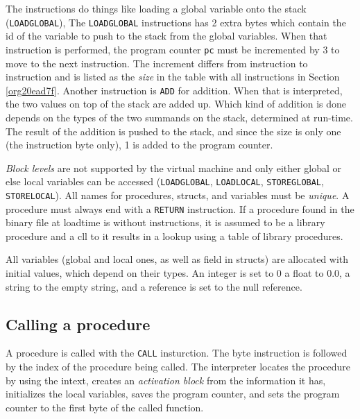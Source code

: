 \documentclass[11pt]{article}
\begin{document}


The instructions do things like loading a global variable onto the stack
(\texttt{LOADGLOBAL}), The \texttt{LOADGLOBAL} instructions has 2 extra bytes which
contain the id of the variable to push to the stack from the global
variables. When that instruction is performed, the program counter \texttt{pc}
must be incremented by 3 to move to the next instruction. The increment
differs from instruction to instruction and is listed as the \emph{size} in the
table with all instructions in Section \ref{org20ead7f}. Another
instruction is \texttt{ADD} for addition. When that is interpreted, the two values
on top of the stack are added up. Which kind of addition is done depends on
the types of the two summands on the stack, determined at run-time. The
result of the addition is pushed to the stack, and since the size is only
one (the instruction byte only), 1 is added to the program counter.



\emph{Block levels} are not supported by the virtual machine and only either
global or else local variables can be accessed (\texttt{LOADGLOBAL}, \texttt{LOADLOCAL},
\texttt{STOREGLOBAL}, \texttt{STORELOCAL}). All names for procedures, structs, and
variables must be \emph{unique}. A procedure must always end with a \texttt{RETURN}
instruction. If a procedure found in the binary file at loadtime is without
instructions, it is assumed to be a library procedure and a cll to it
results in a lookup using a table of library procedures.

All variables (global and local ones, as well as field in structs) are
allocated with initial values, which depend on their types. An integer is
set to \(0\) a float to \(0.0\), a string to the empty string, and a reference
is set to the null reference.

\subsection{Calling a procedure}
\label{sec:org655b598}


A procedure is called with the \texttt{CALL} insturction. The byte instruction is
followed by the index of the procedure being called. The interpreter
locates the procedure by using the intext, creates an \emph{activation block} from
the information it has, initializes the local variables, saves the program
counter, and sets the program counter to the first byte of the called
function.
\end{document}
